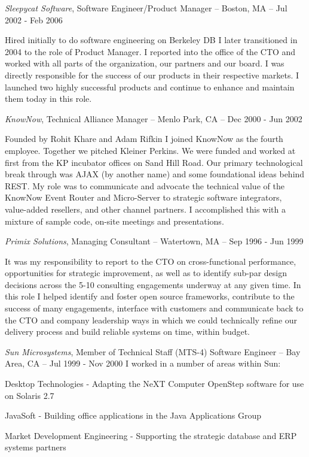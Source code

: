 \documentclass[letterpaper]{article}
\renewenvironment{itemize}{
  \begin{list}{}{
    \setlength{\leftmargin}{1.5em}
  }
}{
  \end{list}
}
\begin{document}
\begin{itemize}
\begin{itemize}
\begin{itemize}
\item {\it Sleepycat Software}, Software Engineer/Product Manager -- Boston, MA -- Jul 2002 - Feb 2006

Hired initially to do software engineering on Berkeley DB I later transitioned
in 2004 to the role of Product Manager. I reported into the office of the CTO
and worked with all parts of the organization, our partners and our board. I
was directly responsible for the success of our products in their respective
markets. I launched two highly successful products and continue to enhance and
maintain them today in this role.

\item {\it KnowNow}, Technical Alliance Manager -- Menlo Park, CA -- Dec 2000 - Jun 2002

Founded by Rohit Khare and Adam Rifkin I joined KnowNow as the fourth
employee. Together we pitched Kleiner Perkins. We were funded and worked at
first from the KP incubator offices on Sand Hill Road. Our primary
technological break through was AJAX (by another name) and some foundational
ideas behind REST. My role was to communicate and advocate the technical value
of the KnowNow Event Router and Micro-Server to strategic software integrators,
value-added resellers, and other channel partners. I accomplished this with a
mixture of sample code, on-site meetings and presentations.

\item {\it Primix Solutions}, Managing Consultant -- Watertown, MA -- Sep 1996 - Jun 1999

It was my responsibility to report to the CTO on cross-functional performance,
opportunities for strategic improvement, as well as to identify sub-par design
decisions across the 5-10 consulting engagements underway at any given time. In
this role I helped identify and foster open source frameworks, contribute to
the success of many engagements, interface with customers and communicate back
to the CTO and company leadership ways in which we could technically refine our
delivery process and build reliable systems on time, within budget.

\item {\it Sun Microsystems}, Member of Technical Staff (MTS-4) Software Engineer -- Bay Area, CA -- Jul 1999 - Nov 2000
I worked in a number of areas within Sun:
\begin{itemize}
\item Desktop Technologies - Adapting the NeXT Computer OpenStep software for use on Solaris 2.7
\item JavaSoft - Building office applications in the Java Applications Group
\item Market Development Engineering - Supporting the strategic database and ERP systems partners
\end{itemize}


\end{itemize}
\end{itemize}
\end{itemize}
\end{document}
